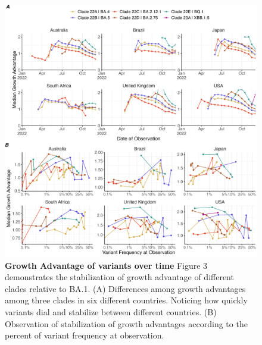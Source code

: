 \documentclass[11pt,oneside,letterpaper]{article}
\begin{document}
\begin{figure}[H]
	\centering
    \includegraphics[width=1.1\textwidth]{figures/ga_estimates.png}
	\caption{\textbf{Growth Advantage of variants over time}
	Figure 3 demonstrates the stabilization of growth advantage of different clades relative to BA.1.
	(A) Differences among growth advantages among three clades in six different countries. 
	Noticing how quickly variants dial and stabilize between different countries.
	(B) Observation of stabilization of growth advantages according to the percent of variant frequency at observation.
	}
	\label{Figure 3}
\end{figure}

%
%
%
%
%
%
%
%
%
%
%
%
%
%
%
%
% 
\end{document}
